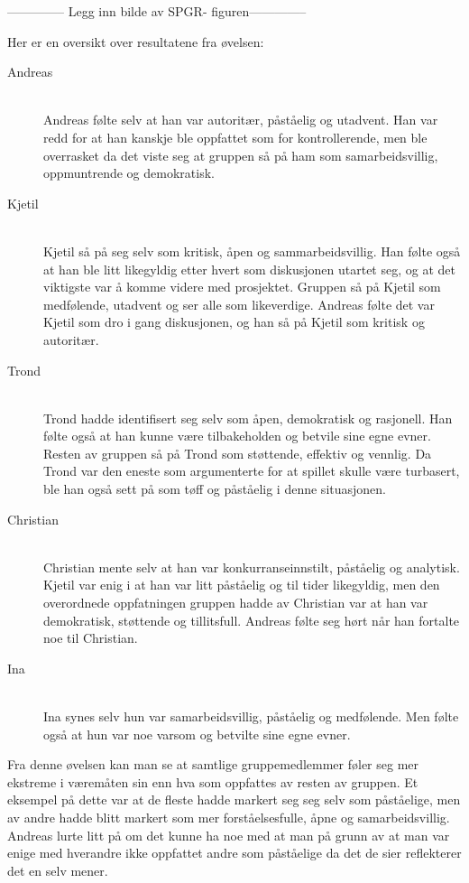 -------------- Legg inn bilde av SPGR- figuren--------------

Her er en oversikt over resultatene fra øvelsen:
\begin{description}
\item[Andreas] \hfill \\
Andreas følte selv at han var autoritær, påståelig og utadvent. Han var redd for at han kanskje ble oppfattet som for kontrollerende, men ble overrasket da det viste seg at gruppen så på ham som samarbeidsvillig, oppmuntrende og demokratisk. 

\item[Kjetil] \hfill \\
Kjetil så på seg selv som kritisk, åpen og sammarbeidsvillig. Han følte også at han ble litt likegyldig etter hvert som diskusjonen utartet seg, og at det viktigste var å komme videre med prosjektet. Gruppen så på Kjetil som medfølende, utadvent og ser alle som likeverdige. Andreas følte det var Kjetil som dro i gang diskusjonen, og han så på Kjetil som kritisk og autoritær.

\item[Trond] \hfill \\	
Trond hadde identifisert seg selv som åpen, demokratisk og rasjonell. Han følte også at han kunne være tilbakeholden og betvile sine egne evner. Resten av gruppen så på Trond som støttende, effektiv og vennlig. Da Trond var den eneste som argumenterte for at spillet skulle være turbasert, ble han også sett på som tøff og påståelig i denne situasjonen. 

\item[Christian] \hfill \\
Christian mente selv at han var konkurranseinnstilt, påståelig og analytisk. Kjetil var enig i at han var litt påståelig og til tider likegyldig, men den overordnede oppfatningen gruppen hadde av Christian var at han var demokratisk, støttende og tillitsfull. Andreas følte seg hørt når han fortalte noe til Christian.

\item[Ina] \hfill \\
Ina synes selv hun var samarbeidsvillig, påståelig og medfølende. Men følte også at hun var noe varsom og betvilte sine egne evner.

\end{description}
Fra denne øvelsen kan man se at samtlige gruppemedlemmer føler seg mer ekstreme i væremåten sin enn hva som oppfattes av resten av gruppen. Et eksempel på dette var at de fleste hadde markert seg seg selv som påståelige, men av andre hadde blitt markert som mer forståelsesfulle, åpne og samarbeidsvillig. Andreas lurte litt på om det kunne ha noe med at man på grunn av at man var enige med hverandre ikke oppfattet andre som påståelige da det de sier reflekterer det en selv mener. 

